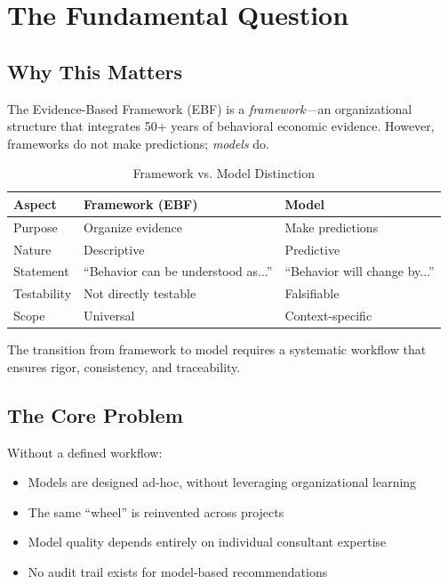 
\section{The Fundamental Question}
\label{sec:eee-fundamental}

\subsection{Why This Matters}

The Evidence-Based Framework (EBF) is a \textit{framework}---an organizational
structure that integrates 50+ years of behavioral economic evidence. However,
frameworks do not make predictions; \textit{models} do.

\begin{table}[htbp]
\centering
\caption{Framework vs. Model Distinction}
\label{tab:eee-framework-model}
\renewcommand{\arraystretch}{1.3}
\begin{tabular}{@{}lll@{}}
\toprule
\textbf{Aspect} & \textbf{Framework (EBF)} & \textbf{Model} \\
\midrule
Purpose & Organize evidence & Make predictions \\
Nature & Descriptive & Predictive \\
Statement & ``Behavior can be understood as...'' & ``Behavior will change by...'' \\
Testability & Not directly testable & Falsifiable \\
Scope & Universal & Context-specific \\
\bottomrule
\end{tabular}
\end{table}

The transition from framework to model requires a systematic workflow that
ensures rigor, consistency, and traceability.

\subsection{The Core Problem}

Without a defined workflow:
\begin{itemize}
\item Models are designed ad-hoc, without leveraging organizational learning
\item The same ``wheel'' is reinvented across projects
\item Model quality depends entirely on individual consultant expertise
\item No audit trail exists for model-based recommendations
\end{itemize}

